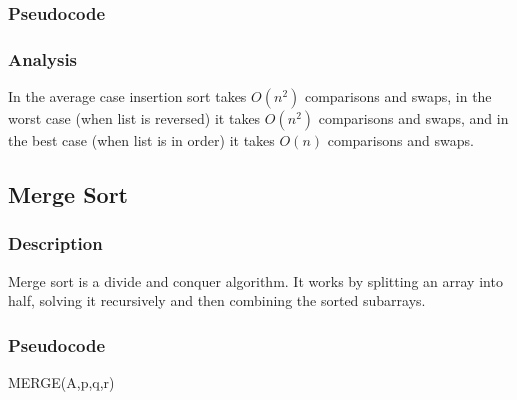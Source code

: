 \documentclass{article}
\begin{document}
        \subsubsection{Pseudocode}
            \begin{algorithmic}[1]
                         
                    \EndWhile
                \EndFor
            \end{algorithmic}
        \subsubsection{Analysis}
            In the average case insertion sort takes $O(n^2)$ comparisons and swaps, in the worst case (when list is reversed) it takes $O(n^2)$ comparisons and swaps, and in the best case (when list is in order) it takes $O(n)$ comparisons and swaps.
    \subsection{Merge Sort}
        \subsubsection{Description}
            Merge sort is a divide and conquer algorithm. It works by  splitting an array into half, solving it recursively and then combining the sorted subarrays.
        \subsubsection{Pseudocode}
            MERGE(A,p,q,r)
            \begin{algorithmic}[1]
            
                \EndFor
                \EndFor
                    \Else
                    \EndIf
                \EndFor
            \end{algorithmic}
            
\end{document}
